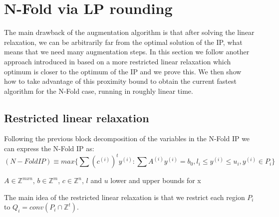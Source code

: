 \newpage
\section{N-Fold via LP rounding}  %

The main drawback of the augmentation algorithm is that after solving the linear relaxation, we can be arbitrarily far from the optimal solution of the IP, what means that we need many augmentation steps. In this section we follow another approach introduced in \cite{EISENBRAND:2020} based on a more restricted linear relaxation which optimum is closer to the optimum of the IP and we prove this. We then show how to take advantage of this proximity bound to obtain the current fastest algorithm for the N-Fold case, running in roughly linear time.


\subsection{Restricted linear relaxation}

Following the previous block decomposition of the variables in the N-Fold IP we can express the N-Fold IP as:
\begin{equation*}
    (N-Fold IP) \equiv max\{\sum (c^{(i)})^t y^{(i)} : \sum A^{(i)} y^{(i)} = b_0, l_i \leq y^{(i)} \leq u_i, y^{(i)} \in P_i \}
\end{equation*}
\vspace{-50pt}
\begin{center}
$A \in \mathbb{Z}^{mxn}$, $b \in \mathbb{Z}^m$, $c \in \mathbb{Z}^n$, $l$  and $u$ lower and upper bounds for x
\end{center}

The main idea of the restricted linear relaxation is that we restrict each region $P_i$ to $Q_i = conv(P_i \cap \mathbb{Z}^t)$.

